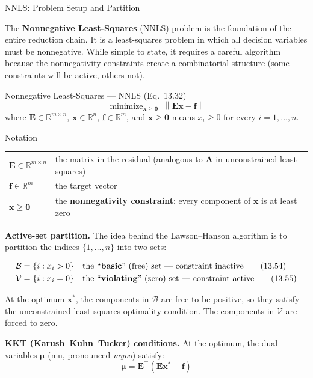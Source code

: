 \documentclass[aspectratio=169,10pt]{beamer}
\DeclareMathOperator*{\minimize}{minimize}
\newcommand{\bx}{\mathbf{x}}
\newcommand{\bA}{\mathbf{A}}
\newcommand{\bE}{\mathbf{E}}
\newcommand{\bmu}{\boldsymbol{\mu}}
\newcommand{\R}{\mathbb{R}}
\newcommand{\norm}[1]{\left\|#1\right\|}
\begin{document}
\begin{frame}[allowframebreaks]{NNLS: Problem Setup and Partition}

  The \textbf{Nonnegative Least-Squares} (NNLS) problem is the foundation of the
  entire reduction chain.  It is a least-squares problem in which all decision
  variables must be nonnegative.  While simple to state, it requires a careful
  algorithm because the nonnegativity constraints create a combinatorial structure
  (some constraints will be active, others not).

  \begin{block}{Nonnegative Least-Squares --- NNLS (Eq.~13.32)}
    \[
      \minimize_{\bx\geq\mathbf{0}}\; \norm{\bE\bx - \mathbf{f}}
    \]
    where $\bE \in \R^{m\times n}$, $\bx \in \R^n$, $\mathbf{f} \in \R^m$, and
    $\bx \geq \mathbf{0}$ means $x_i \geq 0$ for every $i = 1,\ldots,n$.
  \end{block}

  \begin{block}{Notation}
    \begin{tabular}{ll}
      $\bE \in \R^{m\times n}$ & the matrix in the residual (analogous to $\bA$ in unconstrained least squares)\\
      $\mathbf{f} \in \R^m$ & the target vector\\
      $\bx \geq \mathbf{0}$ & the \textbf{nonnegativity constraint}: every component of $\bx$ is at least zero\\
    \end{tabular}
  \end{block}

  \framebreak

  \textbf{Active-set partition.}  The idea behind the Lawson--Hanson algorithm
  is to partition the indices $\{1,\ldots,n\}$ into two sets:

  \begin{align}
    \mathcal{B} &= \{i : x_i > 0\} \quad\text{the ``\textbf{basic}'' (free) set --- constraint inactive} \tag{13.54}\\
    \mathcal{V} &= \{i : x_i = 0\} \quad\text{the ``\textbf{violating}'' (zero) set --- constraint active} \tag{13.55}
  \end{align}

  At the optimum $\bx^*$, the components in $\mathcal{B}$ are free to be positive,
  so they satisfy the unconstrained least-squares optimality condition.  The components
  in $\mathcal{V}$ are forced to zero.

  \textbf{KKT (Karush--Kuhn--Tucker) conditions.}  At the optimum, the dual
  variables $\boldsymbol{\mu}$ (mu, pronounced \emph{myoo}) satisfy:
  \[
    \bmu = \bE^{\top}(\bE\bx^* - \mathbf{f})
  \]


\end{frame}
\end{document}
